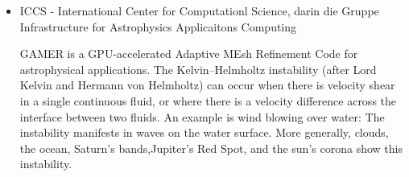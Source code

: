 \begin{itemize}
\item ICCS - International Center for Computationl Science, darin die Gruppe
 Infrastructure for Astrophysics Applicaitons Computing

GAMER is a GPU-accelerated Adaptive MEsh Refinement Code for
astrophysical applications.  The Kelvin–Helmholtz instability (after
Lord Kelvin and Hermann von Helmholtz) can occur when there is
velocity shear in a single continuous fluid, or where there is a
velocity difference across the interface between two fluids. An
example is wind blowing over water: The instability manifests in waves
on the water surface. More generally, clouds, the ocean, Saturn's
bands,Jupiter's Red Spot, and the sun's corona show this instability.

\end{itemize}




